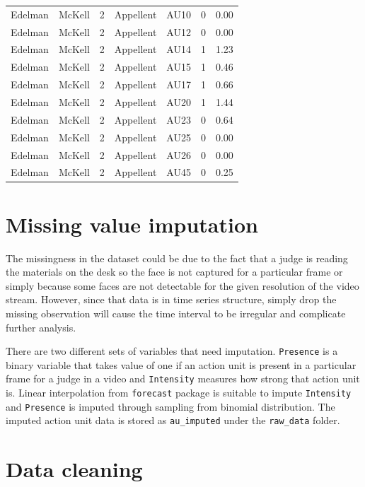 \documentclass{monashthesis}
\begin{document}
\begin{table}[ht]
\begin{center}
\begin{tabular}{lllllll}
Edelman & McKell & 2 & Appellent & AU10 & 0 & 0.00 \\
Edelman & McKell & 2 & Appellent & AU12 & 0 & 0.00 \\
Edelman & McKell & 2 & Appellent & AU14 & 1 & 1.23 \\
Edelman & McKell & 2 & Appellent & AU15 & 1 & 0.46 \\
Edelman & McKell & 2 & Appellent & AU17 & 1 & 0.66 \\
Edelman & McKell & 2 & Appellent & AU20 & 1 & 1.44 \\
Edelman & McKell & 2 & Appellent & AU23 & 0 & 0.64 \\
Edelman & McKell & 2 & Appellent & AU25 & 0 & 0.00 \\
Edelman & McKell & 2 & Appellent & AU26 & 0 & 0.00 \\
Edelman & McKell & 2 & Appellent & AU45 & 0 & 0.25 \\
\bottomrule
\end{tabular}
\end{center}
\end{table}

\hypertarget{missing-value-imputation}{%
\section{Missing value imputation}\label{missing-value-imputation}}

The missingness in the dataset could be due to the fact that a judge is reading the materials on the desk so the face is not captured for a particular frame or simply because some faces are not detectable for the given resolution of the video stream. However, since that data is in time series structure, simply drop the missing observation will cause the time interval to be irregular and complicate further analysis.

There are two different sets of variables that need imputation. \texttt{Presence} is a binary variable that takes value of one if an action unit is present in a particular frame for a judge in a video and \texttt{Intensity} measures how strong that action unit is. Linear interpolation from \texttt{forecast} package is suitable to impute \texttt{Intensity} and \texttt{Presence} is imputed through sampling from binomial distribution. The imputed action unit data is stored as \texttt{au\_imputed} under the \texttt{raw\_data} folder.

\hypertarget{data-cleaning}{%
\section{Data cleaning}\label{data-cleaning}}
\end{document}
